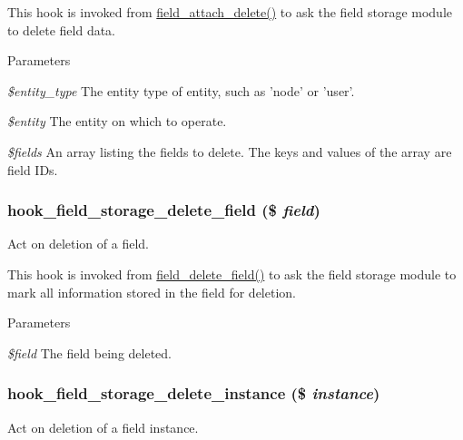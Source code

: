 This hook is invoked from \hyperlink{group__field__attach_gac2e3658c9c02d0d0e71359f9ef2f207a}{field\_\-attach\_\-delete()} to ask the field storage module to delete field data.


\begin{DoxyParams}{Parameters}
\item[{\em \$entity\_\-type}]The entity type of entity, such as 'node' or 'user'. \item[{\em \$entity}]The entity on which to operate. \item[{\em \$fields}]An array listing the fields to delete. The keys and values of the array are field IDs. \end{DoxyParams}
\hypertarget{group__field__storage_ga2102841b167285acf3f0e4e9f854440d}{
\subsubsection[{hook\_\-field\_\-storage\_\-delete\_\-field}]{\setlength{\rightskip}{0pt plus 5cm}hook\_\-field\_\-storage\_\-delete\_\-field (\$ {\em field})}}
\label{group__field__storage_ga2102841b167285acf3f0e4e9f854440d}
Act on deletion of a field.

This hook is invoked from \hyperlink{group__field__crud_gaa4792fd8f5f651b985dec7eca250f0f1}{field\_\-delete\_\-field()} to ask the field storage module to mark all information stored in the field for deletion.


\begin{DoxyParams}{Parameters}
\item[{\em \$field}]The field being deleted. \end{DoxyParams}
\hypertarget{group__field__storage_ga509e10cbd2900c13ab7269f1740a36f7}{
\subsubsection[{hook\_\-field\_\-storage\_\-delete\_\-instance}]{\setlength{\rightskip}{0pt plus 5cm}hook\_\-field\_\-storage\_\-delete\_\-instance (\$ {\em instance})}}
\label{group__field__storage_ga509e10cbd2900c13ab7269f1740a36f7}
Act on deletion of a field instance.

